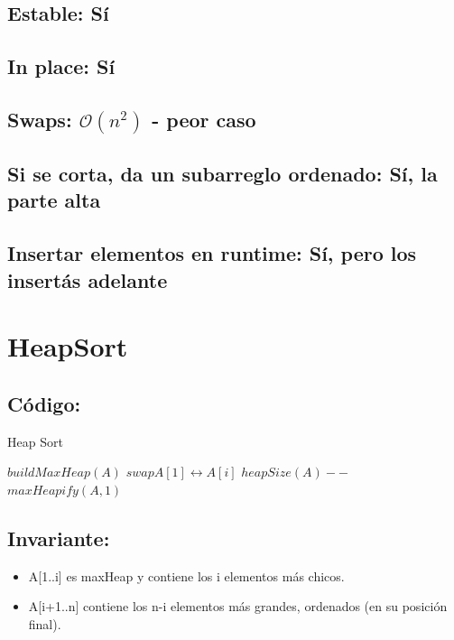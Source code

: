 \documentclass[a4paper]{article}
\begin{document}
\subsection{Estable: S\'i}
\subsection{In place: S\'i}
\subsection{Swaps: $\mathcal{O}(n^{2})$ - peor caso}
\subsection{Si se corta, da un subarreglo ordenado: S\'i, la parte alta}
\subsection{Insertar elementos en runtime: S\'i, pero los insert\'as adelante}

\newpage
\section{HeapSort}

\subsection{C\'odigo:}
\begin{algorithm}
\caption{Heap Sort}\label{selection}
\begin{algorithmic}[1]
	\State $buildMaxHeap(A)$
		\State $swap A[1] \leftrightarrow A[i]$
		\State $heapSize(A)--$
		\State $maxHeapify(A,1)$
	\EndFor
\EndProcedure
\end{algorithmic}
\end{algorithm}

\subsection{Invariante:}
\begin{itemize}
	\item{A[1..i] es maxHeap y contiene los i elementos m\'as chicos.}
	\item{A[i+1..n] contiene los n-i elementos m\'as grandes, ordenados (en su posici\'on final).}
\end{itemize}
\end{document}
